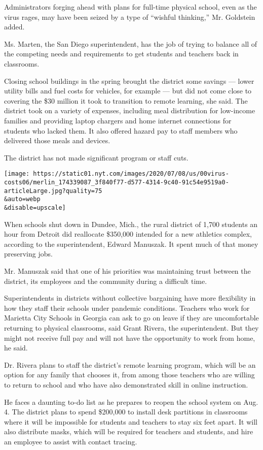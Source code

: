 Administrators forging ahead with plans for full-time physical school,
even as the virus rages, may have been seized by a type of ``wishful
thinking,'' Mr. Goldstein added.

Ms. Marten, the San Diego superintendent, has the job of trying to
balance all of the competing needs and requirements to get students and
teachers back in classrooms.

Closing school buildings in the spring brought the district some savings
--- lower utility bills and fuel costs for vehicles, for example --- but
did not come close to covering the \$30 million it took to transition to
remote learning, she said. The district took on a variety of expenses,
including meal distribution for low-income families and providing laptop
chargers and home internet connections for students who lacked them. It
also offered hazard pay to staff members who delivered those meals and
devices.

The district has not made significant program or staff cuts.

\texttt{[image: https://static01.nyt.com/images/2020/07/08/us/00virus-costs06/merlin\_174339087\_3f840f77-d577-4314-9c40-91c54e9519a0-articleLarge.jpg?quality=75\\\&auto=webp\\\&disable=upscale]}

When schools shut down in Dundee, Mich., the rural district of 1,700
students an hour from Detroit did reallocate \$350,000 intended for a
new athletics complex, according to the superintendent, Edward Manuszak.
It spent much of that money preserving jobs.

Mr. Manuszak said that one of his priorities was maintaining trust
between the district, its employees and the community during a difficult
time.

Superintendents in districts without collective bargaining have more
flexibility in how they staff their schools under pandemic conditions.
Teachers who work for Marietta City Schools in Georgia can ask to go on
leave if they are uncomfortable returning to physical classrooms, said
Grant Rivera, the superintendent. But they might not receive full pay
and will not have the opportunity to work from home, he said.

Dr. Rivera plans to staff the district's remote learning program, which
will be an option for any family that chooses it, from among those
teachers who are willing to return to school and who have also
demonstrated skill in online instruction.

He faces a daunting to-do list as he prepares to reopen the school
system on Aug. 4. The district plans to spend \$200,000 to install desk
partitions in classrooms where it will be impossible for students and
teachers to stay six feet apart. It will also distribute masks, which
will be required for teachers and students, and hire an employee to
assist with contact tracing.

